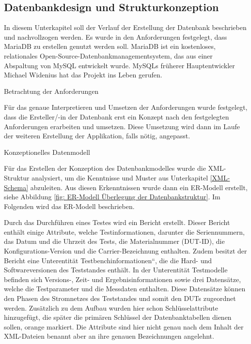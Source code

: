 \subsection{Datenbankdesign und Strukturkonzeption}
\label{subsec:datenbankdesign-und-strukturkonzeption}

In diesem Unterkapitel soll der Verlauf der Erstellung der Datenbank beschrieben und nachvollzogen werden. Es wurde in
den Anforderungen festgelegt, dass MariaDB zu erstellen genutzt werden soll. MariaDB ist ein kostenloses, relationales
Open-Source-Datenbankmanagementsystem, das aus einer Abspaltung von MySQL entwickelt wurde. MySQLs früherer
Hauptentwickler Michael Widenius hat das Projekt ins Leben gerufen.

Betrachtung der Anforderungen

Für das genaue Interpretieren und Umsetzen der Anforderungen wurde festgelegt, dass die Ersteller/-in der Datenbank erst
ein Konzept nach den festgelegten Anforderungen erarbeiten und umsetzen. Diese Umsetzung wird dann im Laufe der weiteren
Erstellung der Applikation, falls nötig, angepasst.

Konzeptionelles Datenmodell

Für das Erstellen der Konzeption des Datenbankmodelles wurde die XML-Struktur analysiert, um die Kenntnisse und Muster
aus Unterkapitel \ref{XML-Schema} abzuleiten.
Aus diesen Erkenntnissen wurde dann ein ER-Modell erstellt, siehe Abbildung \ref{fig: ER-Modell Überlegung der Datenbankstruktur}.
Im Folgenden wird das ER-Modell beschrieben.

Durch das Durchführen eines Testes wird ein Bericht erstellt. Dieser Bericht enthält einige Attribute, welche
Testinformationen, darunter die Seriennummern, das Datum und die Uhrzeit des Tests, die Materialnummer (DUT-ID), die
Konfigurations-Version und die Carrier-Bezeichnung enthalten. Zudem besitzt der Bericht eine Unterentität
Testbenchinformationen“, die die Hard- und Softwareversionen des Teststandes enthält. In der Unterentität Testmodelle
befinden sich Versions-, Zeit- und Ergebnisinformationen sowie drei Datensätze, welche die Testparameter und die Messdaten
enthalten. Diese Datensätze können den Phasen des Stromnetzes des Teststandes und somit den DUTs zugeordnet werden.
Zusätzlich zu dem Aufbau wurden hier schon Schlüsselattribute hinzugefügt, die später die primären Schlüssel der
Datenbanktabellen dienen sollen, orange markiert. Die Attribute sind hier nicht genau nach dem Inhalt der XML-Dateien
benannt aber an ihre genauen Bezeichnungen angelehnt.

